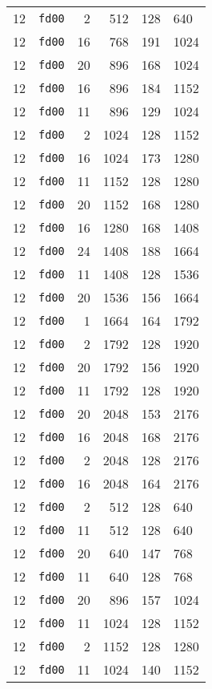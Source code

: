 \documentclass{article}
\begin{document}
\begin{table}[h!]
\begin{tabular}{llrrrl}
    12 & \texttt{fd00} & 2 & 512 & 128 & 640 \\
    12 & \texttt{fd00} & 16 & 768 & 191 & 1024 \\
    12 & \texttt{fd00} & 20 & 896 & 168 & 1024 \\
    12 & \texttt{fd00} & 16 & 896 & 184 & 1152 \\
    12 & \texttt{fd00} & 11 & 896 & 129 & 1024 \\
    12 & \texttt{fd00} & 2 & 1024 & 128 & 1152 \\
    12 & \texttt{fd00} & 16 & 1024 & 173 & 1280 \\
    12 & \texttt{fd00} & 11 & 1152 & 128 & 1280 \\
    12 & \texttt{fd00} & 20 & 1152 & 168 & 1280 \\
    12 & \texttt{fd00} & 16 & 1280 & 168 & 1408 \\
    12 & \texttt{fd00} & 24 & 1408 & 188 & 1664 \\
    12 & \texttt{fd00} & 11 & 1408 & 128 & 1536 \\
    12 & \texttt{fd00} & 20 & 1536 & 156 & 1664 \\
    12 & \texttt{fd00} & 1 & 1664 & 164 & 1792 \\
    12 & \texttt{fd00} & 2 & 1792 & 128 & 1920 \\
    12 & \texttt{fd00} & 20 & 1792 & 156 & 1920 \\
    12 & \texttt{fd00} & 11 & 1792 & 128 & 1920 \\
    12 & \texttt{fd00} & 20 & 2048 & 153 & 2176 \\
    12 & \texttt{fd00} & 16 & 2048 & 168 & 2176 \\
    12 & \texttt{fd00} & 2 & 2048 & 128 & 2176 \\
    12 & \texttt{fd00} & 16 & 2048 & 164 & 2176 \\
    12 & \texttt{fd00} & 2 & 512 & 128 & 640 \\
    12 & \texttt{fd00} & 11 & 512 & 128 & 640 \\
    12 & \texttt{fd00} & 20 & 640 & 147 & 768 \\
    12 & \texttt{fd00} & 11 & 640 & 128 & 768 \\
    12 & \texttt{fd00} & 20 & 896 & 157 & 1024 \\
    12 & \texttt{fd00} & 11 & 1024 & 128 & 1152 \\
    12 & \texttt{fd00} & 2 & 1152 & 128 & 1280 \\
    12 & \texttt{fd00} & 11 & 1024 & 140 & 1152 \\

\end{tabular}
\end{table}
\end{document}
